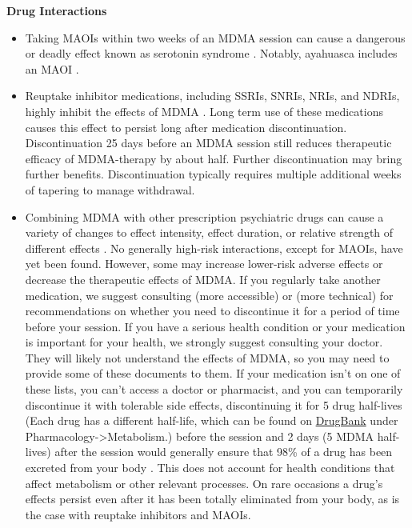 \documentclass[12pt,letterpaper]{book}
\begin{document}
\noindent \textbf{Drug Interactions}
\begin{itemize}
        \item Taking MAOIs within two weeks of an MDMA session can cause a dangerous or deadly effect known as serotonin syndrome \cite{malcolmSerotonin,edinoffInteractions}. Notably, ayahuasca includes an MAOI \cite{ruffell2020pharmacological}.
    \item Reuptake inhibitor medications, including SSRIs, SNRIs, NRIs, and NDRIs, highly inhibit the effects of MDMA \cite{feducciaSSRIDiscontinuation}. Long term use of these medications causes this effect to persist long after medication discontinuation. Discontinuation 25 days before an MDMA session still reduces therapeutic efficacy of MDMA-therapy by about half. Further discontinuation may bring further benefits. Discontinuation typically requires multiple additional weeks of tapering to manage withdrawal.
    \item Combining MDMA with other prescription psychiatric drugs can cause a variety of changes to effect intensity, effect duration, or relative strength of different effects \cite{sarparastDrugInteractions}. No generally high-risk interactions, except for MAOIs, have yet been found. However, some may increase lower-risk adverse effects or decrease the therapeutic effects of MDMA. If you regularly take another medication, we suggest consulting \textcite{liechtiInteractions} (more accessible) or \textcite{sarparastDrugInteractions} (more technical) for recommendations on whether you need to discontinue it for a period of time before your session. If you have a serious health condition or your medication is important for your health, we strongly suggest consulting your doctor. They will likely not understand the effects of MDMA, so you may need to provide some of these documents to them. If your medication isn't on one of these lists, you can't access a doctor or pharmacist, and you can temporarily discontinue it with tolerable side effects, discontinuing it for 5 drug half-lives (Each drug has a different half-life, which can be found on \href{https://go.drugbank.com}{DrugBank} under Pharmacology->Metabolism.) before the session and 2 days (5 MDMA half-lives) after the session would generally ensure that 98\% of a drug has been excreted from your body \cite{andradeHalf,torrePharmacology}. This does not account for health conditions that affect metabolism or other relevant processes. On rare occasions a drug's effects persist even after it has been totally eliminated from your body, as is the case with reuptake inhibitors and MAOIs.


\end{itemize}
\end{document}
